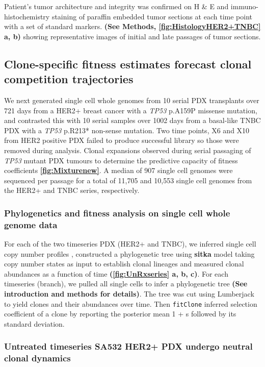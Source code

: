 Patient's tumor architecture and integrity was confirmed on H \& E and immuno-histochemistry staining of paraffin embedded tumor sections at each time point with a set of standard markers. \textbf{(See Methods, {\autoref{fig:HistologyHER2+TNBC}} a, b)} showing representative images of initial and late passages of tumor sections.

\subsection{Clone-specific fitness estimates forecast clonal competition trajectories} 
 
 We next generated single cell whole genomes from 10 serial PDX transplants over 721 days from a HER2+ breast cancer with a \textit{TP53} p.A159P missense mutation, and contrasted this with 10 serial samples over 1002 days from a basal-like \ac{TNBC} PDX with a \textit{TP53} p.R213* non-sense mutation. Two time points, X6 and X10 from HER2 positive PDX failed to produce successful library so those were removed during analysis. Clonal expansions observed during serial passaging of \textit{TP53} mutant PDX tumours to determine the predictive capacity of fitness coefficients \textbf{\autoref{fig:Mixturenew}}.
A median of 907 single cell genomes were sequenced per passage for a total of 11,705 and 10,553 single cell genomes from the HER2+ and TNBC series, respectively. 


\subsubsection{Phylogenetics and fitness analysis on single cell whole genome data}
For each of the two timeseries PDX (HER2+ and TNBC), we inferred single cell copy number profiles , constructed a phylogenetic tree using \textbf{sitka} model taking copy number states as input to establish clonal lineages and measured clonal abundances as a function of time \textbf{(\autoref{fig:UnRxseries} a, b, c)}. For each timeseries (branch), we pulled all single cells to infer a phylogenetic tree \textbf{(See introduction and methods for details)}. The tree was cut using Lumberjack to yield clones and their abundances over time. Then \texttt{fitClone} inferred selection coefficient of a clone by reporting the posterior mean 1 + s followed by its standard deviation.

\subsubsection{Untreated timeseries SA532 HER2+ PDX undergo neutral clonal dynamics}

